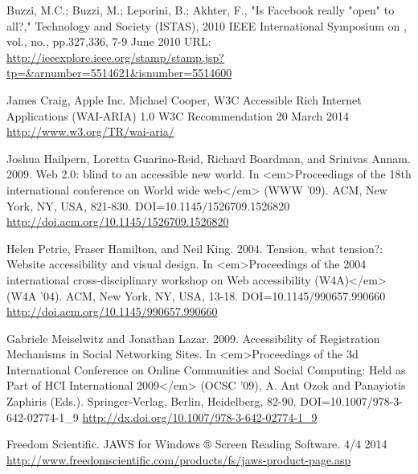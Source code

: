 \documentclass[conference]{IEEEtran}
\begin{document}
\begin{thebibliography}{1}
Buzzi, M.C.; Buzzi, M.; Leporini, B.; Akhter, F., "Is Facebook really "open" to
all?," Technology and Society (ISTAS), 2010 IEEE International Symposium on ,
vol., no., pp.327,336, 7-9 June 2010
URL: \href{http://ieeexplore.ieee.org/stamp/stamp.jsp?tp=\&arnumber=5514621\&isnumber=5514600}{http://ieeexplore.ieee.org/stamp/stamp.jsp?tp=\&arnumber=5514621\&isnumber=5514600}

James Craig, Apple Inc.
Michael Cooper, W3C
Accessible Rich Internet Applications (WAI-ARIA) 1.0
W3C Recommendation 20 March 2014
\url{http://www.w3.org/TR/wai-aria/ }

Joshua Hailpern, Loretta Guarino-Reid, Richard Boardman, and Srinivas Annam.
2009. Web 2.0: blind to an accessible new world.  In <em>Proceedings of the
18th international conference on World wide web</em> (WWW '09). ACM, New York,
NY, USA,  821-830. DOI=10.1145/1526709.1526820
\href{http://doi.acm.org/10.1145/1526709.1526820}{http://doi.acm.org/10.1145/1526709.1526820}

Helen Petrie, Fraser Hamilton, and Neil King. 2004. Tension, what tension?:
Website accessibility and visual design.  In <em>Proceedings of the 2004
international cross-disciplinary workshop on Web accessibility (W4A)</em> (W4A
'04). ACM, New York, NY, USA,  13-18. DOI=10.1145/990657.990660
\href{http://doi.acm.org/10.1145/990657.990660}{http://doi.acm.org/10.1145/990657.990660}

Gabriele Meiselwitz and Jonathan Lazar. 2009. Accessibility of Registration
Mechanisms in Social Networking Sites.  In <em>Proceedings of the 3d
International Conference on Online Communities and Social Computing: Held as
Part of HCI International 2009</em> (OCSC '09), A. Ant Ozok and Panayiotis
Zaphiris (Eds.). Springer-Verlag, Berlin, Heidelberg,  82-90.
DOI=10.1007/978-3-642-02774-1\_9 \href{http://dx.doi.org/10.1007/978-3-642-02774-1\_9}{http://dx.doi.org/10.1007/978-3-642-02774-1\_9}

Freedom Scientific. JAWS for Windows ® Screen Reading Software. 4/4 2014
\href{http://www.freedomscientific.com/products/fs/jaws-product-page.asp}{http://www.freedomscientific.com/products/fs/jaws-product-page.asp }


\end{thebibliography}
\end{document}
